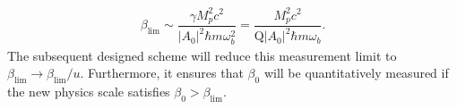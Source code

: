 \documentclass[aps,prl,twocolumn,superscriptaddress]{revtex4-2}
\begin{document}
\begin{equation}
\begin{split}
\beta_{\text{lim}}\sim\dfrac{\gamma M^2_p c^2}{\vert A_0\vert^2\hbar m\omega^2_b}=\dfrac{ M^2_p c^2}{\text{Q}\vert A_0\vert^2\hbar m\omega_b}.
\end{split}
\label{eq:bound}
\end{equation}
The subsequent designed scheme will reduce this measurement limit to $\beta_{\text{lim}}\rightarrow \beta_{\text{lim}}/u$. Furthermore, it ensures that $\beta_0$ will be quantitatively measured if the new physics scale satisfies $\beta_0>\beta_{\text{lim}}$.
\end{document}
